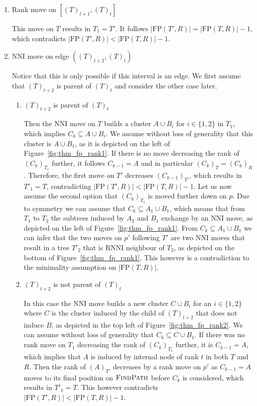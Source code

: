 \documentclass{amsart}
\newcommand{\rnni}{\mathrm{RNNI}}
\newcommand{\findpath}{\textsc{FindPath}}
\newcommand{\nni}{\mathrm{NNI}}
\newcommand{\fp}{\mathrm{FP}}
\begin{document}
\begin{enumerate}[label = 2.\arabic*]
\item Rank move on $[(T)_{t+1},(T)_t]$

This move on $T$ results in $T_1 = T'$.
It follows $|\fp(T',R)| = |\fp(T,R)| - 1$, which contradicts $|\fp(T',R)| < |\fp(T,R)| - 1$.

\item $\nni$ move on edge $((T)_{t+2},(T)_{t})$

Notice that this is only possible if this interval is an edge.
We first assume that $(T)_{t+2}$ is parent of $(T)_t$ and consider the other case later.

\begin{enumerate}
    \item $(T)_{t+2}$ is parent of $(T)_t$

    Then the $\nni$ move on $T$ builds a cluster $A \cup B_i$ for $i \in \{1,2\}$ in $T_1$, which implies $C_k \subseteq A \cup B_i$.
    We assume without loss of generality that this cluster is $A \cup B_1$, as it is depicted on the left of Figure~\ref{fig:thm_fp_rank1}.
    If there is no move decreasing the rank of $(C_k)_{T_1}$ further, it follows $C_{k-1} = A$ and in particular $(C_k)_T = (C_k)_R$.
    Therefore, the first move on $T'$ decreases $(C_{k-1})_{T'}$, which results in $T'_1 = T$, contradicting $|\fp(T',R)| < |\fp(T,R)| - 1$.
    Let us now assume the second option that $(C_k)_{T_1}$ is moved further down on $p$.
    Due to symmetry we can assume that $C_k \subseteq A_1 \cup B_1$, which means that from $T_1$ to $T_2$ the subtrees induced by $A_2$ and $B_1$ exchange by an $\nni$ move, as depicted on the left of Figure~\ref{fig:thm_fp_rank1}.
    From $C_k \subseteq A_1 \cup B_1$ we can infer that the two moves on $p'$ following $T'$ are two $\nni$ moves that result in a tree $T'_2$ that is $\rnni$ neighbour of $T_2$, as depicted on the bottom of Figure~\ref{fig:thm_fp_rank1}.
    This however is a contradiction to the minimality assumption on $|\fp(T,R)|$.

    \item $(T)_{t+2}$ is not parent of $(T)_t$

    In this case the $\nni$ move builds a new cluster $C \cup B_i$ for an $i \in \{1,2\}$ where $C$ is the cluster induced by the child of $(T)_{t+2}$ that does not induce $B$, as depicted in the top left of Figure~\ref{fig:thm_fp_rank2}.
    We can assume without loss of generality that $C_k \subseteq C \cup B_1$.
    If there was no rank move on $T_1$ decreasing the rank of $(C_k)_{T_1}$ further, it is $C_{k-1} = A$, which implies that $A$ is induced by internal node of rank $t$ in both $T$ and $R$.
    Then the rank of $(A)_{T'}$ decreases by a rank move on $p'$ as $C_{k-1} = A$ moves to its final position on $\findpath$ before $C_k$ is considered, which results in $T'_1 = T$.
    This however contradicts $|\fp(T',R)| < |\fp(T,R)| - 1$.


\end{enumerate}
\end{enumerate}
\end{document}
